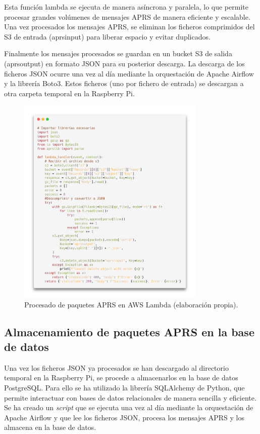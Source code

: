 \noindent Esta función lambda se ejecuta de manera asíncrona y paralela, lo que permite procesar grandes volúmenes de mensajes APRS de manera eficiente y escalable. Una vez procesados los mensajes APRS, se eliminan los ficheros comprimidos del S3 de entrada (aprsinput) para liberar espacio y evitar duplicados.

Finalmente los mensajes procesados se guardan en un bucket S3 de salida (aprsoutput) en formato JSON para su posterior descarga. La descarga de los ficheros JSON ocurre una vez al día mediante la orquestación de Apache Airflow y la librería Boto3. Estos ficheros (uno por fichero de entrada) se descargan a otra carpeta temporal en la Raspberry Pi.

\begin{figure}[h]
	\centering
	\includegraphics[width=0.8\textwidth]{Imagenes/Chapter_4/lambda.png}
	\caption[Procesado de paquetes APRS en AWS Lambda.]{Procesado de paquetes APRS en AWS Lambda (elaboración propia).}
	\label{fig:aws-lambda}
\end{figure}

\subsection{Almacenamiento de paquetes APRS en la base de datos}

Una vez los ficheros JSON ya procesados se han descargado al directorio temporal en la Raspberry Pi, se procede a almacenarlos en la base de datos PostgreSQL. Para ello se ha utilizado la librería SQLAlchemy de Python, que permite interactuar con bases de datos relacionales de manera sencilla y eficiente. Se ha creado un \textit{script} que se ejecuta una vez al día mediante la orquestación de Apache Airflow y que lee los ficheros JSON, procesa los mensajes APRS y los almacena en la base de datos.

